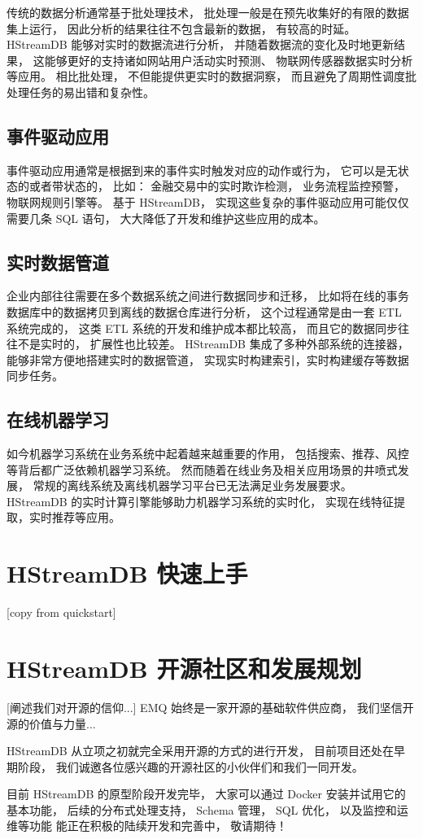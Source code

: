 \documentclass{ctexart}
\begin{document}
传统的数据分析通常基于批处理技术，
批处理一般是在预先收集好的有限的数据集上运行，
因此分析的结果往往不包含最新的数据，
有较高的时延。
HStreamDB 能够对实时的数据流进行分析，
并随着数据流的变化及时地更新结果，
这能够更好的支持诸如网站用户活动实时预测、
物联网传感器数据实时分析等应用。
相比批处理，
不但能提供更实时的数据洞察，
而且避免了周期性调度批处理任务的易出错和复杂性。

\subsection{事件驱动应用}

事件驱动应用通常是根据到来的事件实时触发对应的动作或行为，
它可以是无状态的或者带状态的，
比如：
金融交易中的实时欺诈检测，
业务流程监控预警，
物联网规则引擎等。
基于 HStreamDB，
实现这些复杂的事件驱动应用可能仅仅需要几条 SQL 语句，
大大降低了开发和维护这些应用的成本。

\subsection{实时数据管道}

企业内部往往需要在多个数据系统之间进行数据同步和迁移，
比如将在线的事务数据库中的数据拷贝到离线的数据仓库进行分析，
这个过程通常是由一套 ETL 系统完成的，
这类 ETL 系统的开发和维护成本都比较高，
而且它的数据同步往往不是实时的，
扩展性也比较差。
HStreamDB 集成了多种外部系统的连接器，
能够非常方便地搭建实时的数据管道，
实现实时构建索引，实时构建缓存等数据同步任务。

\subsection{在线机器学习}

如今机器学习系统在业务系统中起着越来越重要的作用，
包括搜索、推荐、风控等背后都广泛依赖机器学习系统。
然而随着在线业务及相关应用场景的井喷式发展，
常规的离线系统及离线机器学习平台已无法满足业务发展要求。
HStreamDB 的实时计算引擎能够助力机器学习系统的实时化，
实现在线特征提取，实时推荐等应用。

\section{HStreamDB 快速上手}

[copy from quickstart]


\section{HStreamDB 开源社区和发展规划}

[阐述我们对开源的信仰...]
EMQ 始终是一家开源的基础软件供应商，
我们坚信开源的价值与力量...

HStreamDB 从立项之初就完全采用开源的方式的进行开发，
目前项目还处在早期阶段，
我们诚邀各位感兴趣的开源社区的小伙伴们和我们一同开发。

目前 HStreamDB 的原型阶段开发完毕，
大家可以通过 Docker 安装并试用它的基本功能，
后续的分布式处理支持，
Schema 管理，
SQL 优化，
以及监控和运维等功能
能正在积极的陆续开发和完善中，
敬请期待！
\end{document}
